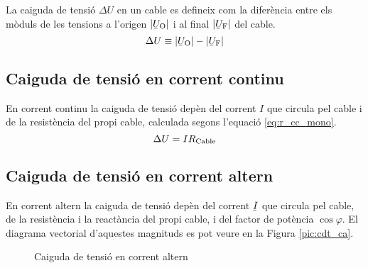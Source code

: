 La caiguda de tensi\'{o} $\Delta U$ en un cable es defineix com la difer\`{e}ncia entre els m\`{o}duls de les tensions a l'origen $|{\cmplx{U}\ped{O}}|$ i al final $|\cmplx{U}\ped{F}|$ del cable.
\begin{equation}
   \Delta U \equiv |\cmplx{U}\ped{O}| - |\cmplx{U}\ped{F}|
\end{equation}

\subsection{Caiguda de tensi\'{o} en corrent continu}

En corrent continu la caiguda de tensi\'{o} dep\`{e}n del corrent $I$ que circula pel cable i de la  resist\`{e}ncia del propi cable, calculada segons l'equaci\'{o} \eqref{eq:r_cc_mono}.
\begin{equation}
   \Delta U = I R_\mathrm{Cable}
\end{equation}

\subsection{Caiguda de tensi\'{o} en corrent altern}

En corrent altern la caiguda de tensi\'{o}
dep\`{e}n del  corrent $\cmplx{I}$ que circula pel cable, de la
resist\`{e}ncia i la react\`{a}ncia del propi cable, i del factor de
pot\`{e}ncia $\cos \varphi$. El diagrama vectorial d'aquestes magnituds
es pot veure en la Figura \vref{pic:cdt_ca}.
\begin{figure}[htb]
   \centering
{}
   \caption{Caiguda de tensi\'{o} en corrent altern}\label{pic:cdt_ca}
\end{figure}

